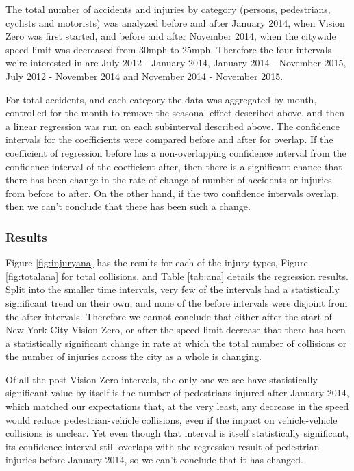 \documentclass[10pt,journal,compsoc]{IEEEtran}
\begin{document}
The total number of accidents and injuries by category (persons, pedestrians, cyclists and motorists) was analyzed before and after January 2014, when Vision Zero was first started, and before and after November 2014, when the citywide speed limit was decreased from 30mph to 25mph.  Therefore the four intervals we're interested in are July 2012 - January 2014, January 2014 - November 2015, July 2012 - November 2014 and November 2014 - November 2015.

For total accidents, and each category the data was aggregated by month, controlled for the month to remove the seasonal effect described above, and then a linear regression was run on each subinterval described above.  The confidence intervals for the coefficients were compared before and after for overlap.  If the coefficient of regression before has a non-overlapping confidence interval from the confidence interval of the coefficient after, then there is a significant chance that there has been  change in the rate of change of number of accidents or injuries from before to after.  On the other hand, if the two confidence intervals overlap, then we can't conclude that there has been such a change.

\subsubsection{Results}

Figure \ref{fig:injuryana} has the results for each of the injury types, Figure \ref{fig:totalana} for total collisions, and Table \ref{tab:ana} details the regression results.  Split into the smaller time intervals, very few of the intervals had a statistically significant trend on their own, and none of the before intervals were disjoint from the after intervals.  Therefore we cannot conclude that either after the start of New York City Vision Zero, or after the speed limit decrease that there has been a statistically significant change in rate at which the total number of collisions or the number of injuries across the city as a whole is changing.  

Of all the post Vision Zero intervals, the only one we see have statistically significant value by itself is the number of pedestrians injured after January 2014, which matched our expectations that, at the very least, any decrease in the speed would reduce pedestrian-vehicle collisions, even if the impact on vehicle-vehicle collisions is unclear.  Yet even though that interval is itself statistically significant, its confidence interval still overlaps with the regression result of pedestrian injuries before January 2014, so we can't conclude that it has changed.
\end{document}
